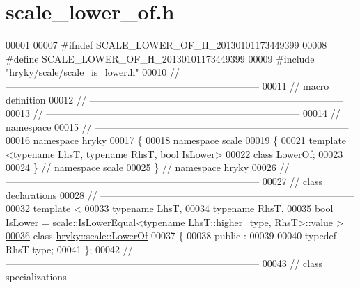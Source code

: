 \hypertarget{scale__lower__of_8h_source}{\section{scale\-\_\-lower\-\_\-of.\-h}
}

\begin{DoxyCode}
00001 
00007 \textcolor{preprocessor}{#ifndef SCALE\_LOWER\_OF\_H\_20130101173449399}
00008 \textcolor{preprocessor}{}\textcolor{preprocessor}{#define SCALE\_LOWER\_OF\_H\_20130101173449399}
00009 \textcolor{preprocessor}{}\textcolor{preprocessor}{#include "\hyperlink{scale__is__lower_8h}{hryky/scale/scale_is_lower.h}"}
00010 \textcolor{comment}{//
      ------------------------------------------------------------------------------}
00011 \textcolor{comment}{// macro definition}
00012 \textcolor{comment}{//
      ------------------------------------------------------------------------------}
00013 \textcolor{comment}{//
      ------------------------------------------------------------------------------}
00014 \textcolor{comment}{// namespace}
00015 \textcolor{comment}{//
      ------------------------------------------------------------------------------}
00016 \textcolor{keyword}{namespace }hryky
00017 \{
00018 \textcolor{keyword}{namespace }scale
00019 \{
00021     \textcolor{keyword}{template} <\textcolor{keyword}{typename} LhsT, \textcolor{keyword}{typename} RhsT, \textcolor{keywordtype}{bool} IsLower>
00022     \textcolor{keyword}{class }LowerOf;
00023 
00024 \} \textcolor{comment}{// namespace scale}
00025 \} \textcolor{comment}{// namespace hryky}
00026 \textcolor{comment}{//
      ------------------------------------------------------------------------------}
00027 \textcolor{comment}{// class declarations}
00028 \textcolor{comment}{//
      ------------------------------------------------------------------------------}
00032 \textcolor{comment}{}\textcolor{keyword}{template} <
00033     \textcolor{keyword}{typename} LhsT,
00034     \textcolor{keyword}{typename} RhsT,
00035     \textcolor{keywordtype}{bool} IsLower = scale::IsLowerEqual<typename LhsT::higher\_type, RhsT>::value
       >
\hypertarget{scale__lower__of_8h_source_l00036}{}\hyperlink{classhryky_1_1scale_1_1_lower_of}{00036} \textcolor{keyword}{class }\hyperlink{classhryky_1_1scale_1_1_lower_of}{hryky::scale::LowerOf}
00037 \{
00038 \textcolor{keyword}{public} :
00039 
00040     \textcolor{keyword}{typedef} RhsT type;
00041 \};
00042 \textcolor{comment}{//
      ------------------------------------------------------------------------------}
00043 \textcolor{comment}{// class specializations}

\end{DoxyCode}
